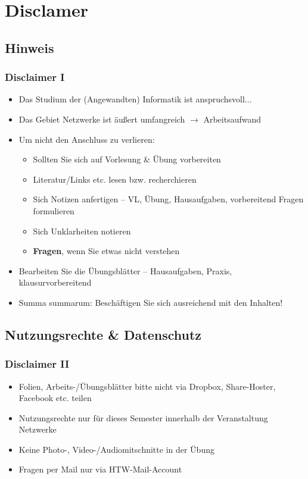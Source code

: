 \documentclass[xcolor=dvipsnames,aspectratio=169]{beamer}
\begin{document}
\section{Disclamer}
\subsection{Hinweis}
\begin{frame}
	\frametitle{Disclaimer I}
	\begin{itemize}
		\item Das Studium der (Angewandten) Informatik ist anspruchsvoll...
		\item Das Gebiet Netzwerke ist äußert umfangreich $\rightarrow$ Arbeitsaufwand
		\item Um nicht den Anschluss zu verlieren:
		\begin{itemize}
			\item Sollten Sie sich auf Vorlesung \& Übung vorbereiten
			\item Literatur/Links etc. lesen bzw. recherchieren
			\item Sich Notizen anfertigen -- VL, Übung, Hausaufgaben, vorbereitend Fragen formulieren
			\item Sich Unklarheiten notieren
			\item \textbf{Fragen}, wenn Sie etwas nicht verstehen 
	\end{itemize}		
		\item Bearbeiten Sie die Übungsblätter -- Hausaufgaben, Praxis, klausurvorbereitend
		\item Sum­ma sum­ma­rum: Beschäftigen Sie sich ausreichend mit den Inhalten!
	\end{itemize}
\end{frame}
\subsection{Nutzungsrechte \& Datenschutz}
\begin{frame}
	\frametitle{Disclaimer II}
	\begin{itemize}
		\item Folien, Arbeits-/Übungsblätter bitte nicht via Dropbox, Share-Hoster, Facebook etc. teilen
		\item Nutzungsrechte nur für dieses Semester innerhalb der Veranstaltung Netzwerke
		\item Keine Photo-, Video-/Audiomitschnitte in der Übung
		\item Fragen per Mail nur via HTW-Mail-Account
	\end{itemize}
\end{frame}
\end{document}
